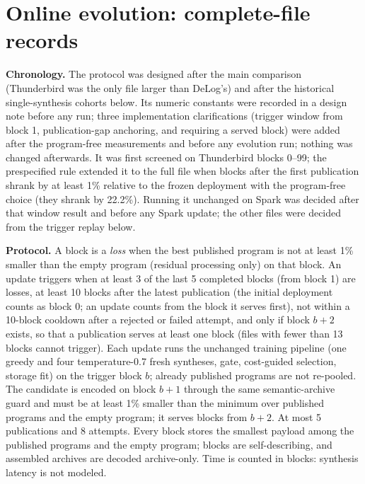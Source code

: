 \section{Online evolution: complete-file records}\label{sec:supp-evolution}
\textbf{Chronology.} The protocol was designed after the main comparison (Thunderbird was the only file larger than DeLog's) and after the historical single-synthesis cohorts below. Its numeric constants were recorded in a design note before any run; three implementation clarifications (trigger window from block 1, publication-gap anchoring, and requiring a served block) were added after the program-free measurements and before any evolution run; nothing was changed afterwards. It was first screened on Thunderbird blocks 0--99; the prespecified rule extended it to the full file when blocks after the first publication shrank by at least 1\% relative to the frozen deployment with the program-free choice (they shrank by 22.2\%). Running it unchanged on Spark was decided after that window result and before any Spark update; the other files were decided from the trigger replay below.
\par\textbf{Protocol.} A block is a \emph{loss} when the best published program is not at least 1\% smaller than the empty program (residual processing only) on that block. An update triggers when at least 3 of the last 5 completed blocks (from block 1) are losses, at least 10 blocks after the latest publication (the initial deployment counts as block 0; an update counts from the block it serves first), not within a 10-block cooldown after a rejected or failed attempt, and only if block $b+2$ exists, so that a publication serves at least one block (files with fewer than 13 blocks cannot trigger). Each update runs the unchanged training pipeline (one greedy and four temperature-0.7 fresh syntheses, gate, cost-guided selection, storage fit) on the trigger block $b$; already published programs are not re-pooled. The candidate is encoded on block $b+1$ through the same semantic-archive guard and must be at least 1\% smaller than the minimum over published programs and the empty program; it serves blocks from $b+2$. At most 5 publications and 8 attempts. Every block stores the smallest payload among the published programs and the empty program; blocks are self-describing, and assembled archives are decoded archive-only. Time is counted in blocks: synthesis latency is not modeled.
